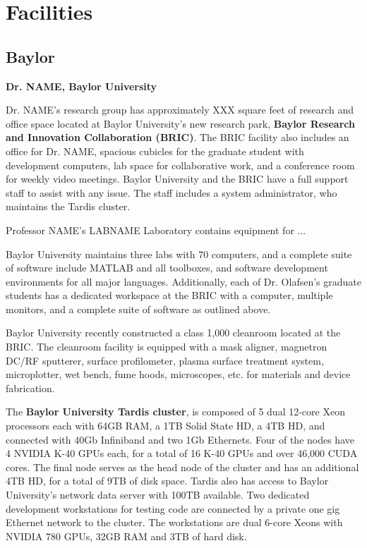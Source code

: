 \section{Facilities}

\subsection{Baylor}


\noindent\textbf{Dr. NAME, Baylor University}

Dr. NAME's research group has approximately XXX square feet of research and office space located at Baylor University's new research park, \textbf{Baylor Research and Innovation Collaboration (BRIC)}. The BRIC facility also includes an office for Dr. NAME, spacious cubicles for the graduate student with development computers, lab space for collaborative work, and a conference room for weekly video meetings. Baylor University and the BRIC have a full support staff to assist with any issue. The staff includes a system administrator, who maintains the Tardis cluster. 


Professor NAME's LABNAME Laboratory contains equipment for ...

Baylor University maintains three labs with 70 computers, and a complete suite of software include MATLAB and all toolboxes, and software development environments for all major languages.  Additionally, each of Dr. Olafsen's graduate students has a dedicated workspace at the BRIC with a computer, multiple monitors, and a complete suite of software as outlined above.

Baylor University recently constructed a class 1,000 cleanroom located at the BRIC.  The cleanroom facility is equipped with a mask aligner, magnetron DC/RF sputterer, surface profilometer, plasma surface treatment system, microplotter, wet bench, fume hoods, microscopes, etc. for materials and device fabrication.


The \textbf{Baylor University Tardis cluster}, is composed of 5 dual 12-core Xeon processors each with 64GB RAM, a 1TB Solid State HD, a 4TB HD, and connected with 40Gb Infiniband and two 1Gb Ethernets. Four of the nodes have 4 NVIDIA K-40 GPUs each, for a total of 16 K-40 GPUs and over 46,000 CUDA cores. The final node serves as the head node of the cluster and has an additional 4TB HD, for a total of 9TB of disk space. Tardis also has access to Baylor University's network data server with 100TB available.  Two dedicated development workstations for testing code are connected by a private one gig Ethernet network to the cluster. The workstations are dual 6-core Xeons with NVIDIA 780 GPUs, 32GB RAM and 3TB of hard disk.

